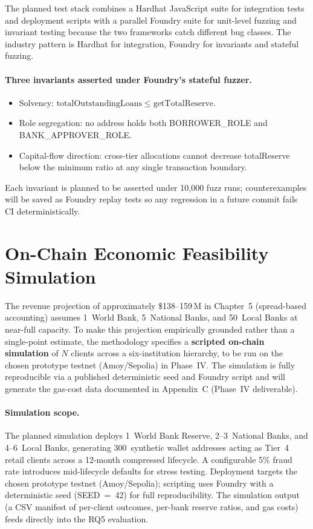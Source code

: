 \documentclass[12pt,a4paper]{report}
\begin{document}
The planned test stack combines a Hardhat JavaScript suite for integration tests and deployment scripts with a parallel Foundry suite for unit-level fuzzing and invariant testing because the two frameworks catch different bug classes. The industry pattern is Hardhat for integration, Foundry for invariants and stateful fuzzing.

\paragraph{Three invariants asserted under Foundry's stateful fuzzer.}
\begin{itemize}[noitemsep]
\item Solvency: \(\mathrm{totalOutstandingLoans} \le \mathrm{getTotalReserve}\).
\item Role segregation: no address holds both BORROWER\_ROLE and BANK\_APPROVER\_ROLE.
\item Capital-flow direction: cross-tier allocations cannot decrease totalReserve below the minimum ratio at any single transaction boundary.
\end{itemize}

Each invariant is planned to be asserted under 10{,}000 fuzz runs; counterexamples will be saved as Foundry replay tests so any regression in a future commit fails CI deterministically.

\section{On-Chain Economic Feasibility Simulation}
\label{sec:abm-sim}

The revenue projection of approximately \$138--159\,M in Chapter~5 (spread-based accounting) assumes 1~World Bank, 5~National Banks, and 50~Local Banks at near-full capacity. To make this projection empirically grounded rather than a single-point estimate, the methodology specifies a \textbf{scripted on-chain simulation} of $N$ clients across a six-institution hierarchy, to be run on the chosen prototype testnet (Amoy/Sepolia) in Phase~IV. The simulation is fully reproducible via a published deterministic seed and Foundry script and will generate the gas-cost data documented in Appendix~C (Phase~IV deliverable).

\paragraph{Simulation scope.}
The planned simulation deploys 1~World Bank Reserve, 2--3~National Banks, and 4--6~Local Banks, generating 300~synthetic wallet addresses acting as Tier~4 retail clients across a 12-month compressed lifecycle. A configurable 5\% fraud rate introduces mid-lifecycle defaults for stress testing. Deployment targets the chosen prototype testnet (Amoy/Sepolia); scripting uses Foundry with a deterministic seed (SEED~=~42) for full reproducibility. The simulation output (a CSV manifest of per-client outcomes, per-bank reserve ratios, and gas costs) feeds directly into the RQ5 evaluation.
\end{document}
